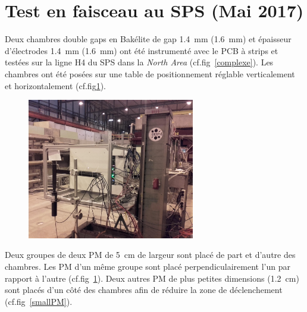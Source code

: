 \section{Test en faisceau au SPS (Mai 2017)}
\vspace*{-0.4cm}
Deux chambres double gaps en Bakélite de gap \SI{1.4}{\milli\meter} (\SI{1.6}{\milli\meter}) et épaisseur d'électrodes \SI{1.4}{\milli\meter} (\SI{1.6}{\milli\meter}) ont été instrumenté avec le PCB à strips et testées sur la ligne H4 du SPS dans la \textit{North Area} (cf.fig~\ref{complexe}). Les chambres ont été posées sur une table de positionnement réglable verticalement et horizontalement (cf.fig\ref{setup2017}).
\begin{figure}[ht!]
	\centering
	\includegraphics[width=0.65\textwidth]{ELE/setup2017.jpg}
	\label{setup2017}
\end{figure}

Deux groupes de deux PM de \SI{5}{\centi\meter} de largeur sont placé de part et d'autre des chambres. Les PM d'un même groupe sont placé perpendiculairement l'un par rapport à l'autre (cf.fig~\ref{setup2017}). Deux autres PM de plus petites dimensions (\SI{1.2}{\centi\meter}) sont placés d'un côté des chambres afin de réduire la zone de déclenchement (cf.fig~\ref{smallPM}).  

